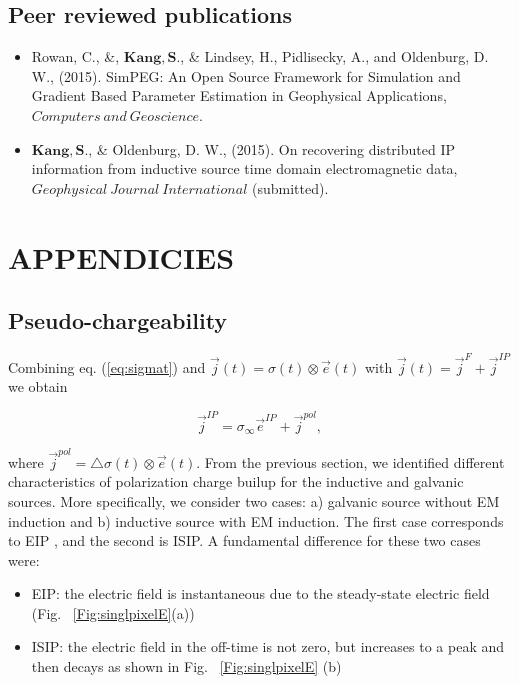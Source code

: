 \documentclass[letterpaper,11pt]{article}
\newcommand{\siginf}{\sigma_\infty}
\newcommand{\dsig}{\triangle\sigma}
\renewcommand {\j}  { {\vec j} }
\newcommand {\e}  { {\vec e} }
\begin{document}
\subsection{Peer reviewed publications}
\begin{itemize}
\item
Rowan, C., \&, $\mathbf{Kang, S.}$, \& Lindsey, H., Pidlisecky, A., and Oldenburg, D. W., (2015). SimPEG: An Open Source Framework for Simulation and Gradient Based Parameter Estimation in Geophysical Applications, $\mathit Computers \ and \ Geoscience$.
\item 
$\mathbf{Kang, S.}$, \& Oldenburg, D. W., (2015). On recovering distributed IP information from inductive source time domain electromagnetic data,  $\mathit Geophysical \ Journal \ International$ (submitted).
\end{itemize}

% 



\clearpage
\section{APPENDICIES}
\label{section:appendix}
\subsection{Pseudo-chargeability}
\label{appendix: pseudochargeability}
Combining eq. (\ref{eq:sigmat}) and  $\j(t) = \sigma(t)\otimes \e(t)$ with $\j(t)=\j^F + \j^{IP}$ we obtain
\begin{linenomath*}
\begin{equation}
  \j^{IP} = \siginf \e^{IP} + \j^{pol}, 
  \label{eq:IP_current}
\end{equation}
\end{linenomath*}
where $\j^{pol} = \dsig(t)\otimes\e(t)$. 
From the previous section, we identified different characteristics of polarization charge builup for the inductive and galvanic sources. 
More specifically, we consider two cases: a) galvanic source without EM induction and b) inductive source with EM induction. The first case corresponds to EIP \cite[]{seigel1959}, and the second is ISIP.
A fundamental difference for these two cases were: 
\begin{itemize}
  \item EIP: the electric field is instantaneous due to the steady-state electric field (Fig. ~\ref{Fig:singlpixelE}(a))
  \item ISIP:  the electric field in the off-time is not zero, but increases to a peak and then decays as shown in Fig. ~\ref{Fig:singlpixelE} (b)
\end{itemize}
\end{document}
